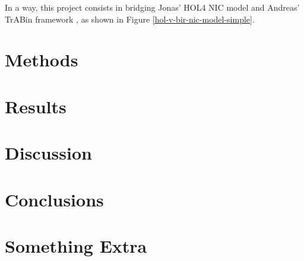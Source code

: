 \documentclass{kththesis}
\begin{document}
In a way, this project consists in bridging Jonas' HOL4 NIC model
\cite{haglund_formal_2016} and Andreas' TrABin framework
\cite{lindner_trabin:_2019}, as shown in Figure
\ref{hol-v-bir-nic-model-simple}.

\chapter{Methods}

\chapter{Results}

\chapter{Discussion}

\chapter{Conclusions}

\printbibliography[heading=bibintoc]

\appendix

\chapter{Something Extra}

\tailmatter %
\end{document}
